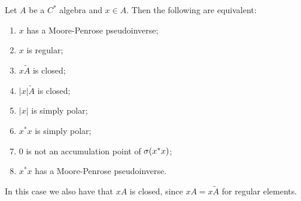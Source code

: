\begin{proposition}
Let $A$ be a $C^*$ algebra and $x\in A$. Then the following are equivalent:
\begin{enumerate}
\item $x$ has a Moore-Penrose pseudoinverse;
\item $x$ is regular;
\item $x\widetilde{A}$ is closed;
\item $|x|\widetilde{A}$ is closed;
\item $|x|$ is simply polar;
\item $x^*x$ is simply polar;
\item $0$ is not an accumulation point of $\sigma(x^*x)$;
\item $x^*x$ has a Moore-Penrose pseudoinverse.
\end{enumerate}
\end{proposition}
In this case we also have that $xA$ is closed, since $xA = x\widetilde{A}$ for regular elements.

